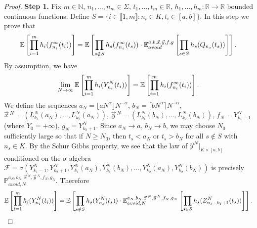 \begin{proof}
	\noindent\textbf{Step 1. } Fix $m\in\mathbb{N}$, $n_1,\dots,n_m\in\Sigma$, $t_1,\dots,t_m\in\mathbb{R}$, $h_1,\dots,h_m : \mathbb{R}\to\mathbb{R}$ bounded continuous functions. Define $S = \{i\in\llbracket 1,m\rrbracket : n_i \in K, t_i \in [a,b]\}$. In this step we prove that
	\begin{equation}\label{BBcondexsplit}
		\mathbb{E}\left[\prod_{i=1}^m h_i(f^\infty_{n_i}(t_i))\right] = \mathbb{E}\left[\prod_{s\notin S} h_s(f^\infty_{n_s}(t_s))\cdot\mathbb{E}^{a,b,\vec{x},\vec{y},f,g}_{avoid}\left[\prod_{s\in S} h_s(Q_{n_s}(t_s))\right]\right].
	\end{equation}
	By assumption, we have
	\begin{equation}\label{BGPweak}
		\lim_{N\to\infty}\mathbb{E}\left[\prod_{i=1}^m h_i(Y^N_{n_i}(t_i))\right] = \mathbb{E}\left[\prod_{i=1}^m h_i(f^\infty_{n_i}(t_i))\right].
	\end{equation}
	We define the sequences $a_N = \lfloor aN^\alpha\rfloor N^{-\alpha}$, $b_N = \lceil bN^\alpha\rceil N^{-\alpha}$, $\vec{x}\,^N = (L_{k_1}^N(a_N),\dots,L_{k_2}^N(a_N))$, $\vec{y}\,^N = (L_{k_1}^N(b_N),\dots,L_{k_2}^N(b_N))$, $f_N = Y_{k_1-1}^N$ (where $Y_0 = +\infty$), $g_N = Y_{k_2+1}^N$. Since $a_N \to a$, $b_N\to b$, we may choose $N_0$ sufficiently large so that if $N\geq N_0$, then $t_s < a_N$ or $t_s > b_N$ for all $s\notin S$ with $n_s \in K$. By the Schur Gibbs property, we see that the law of $\mathcal{Y}^N|_{K\times[a,b]}$ conditioned on the $\sigma$-algebra $\mathcal{F} = \sigma\left(Y^N_{k_1-1}, Y^N_{k_2+1}, Y^N_{k_1}(a_N), Y^N_{k_1}(b_N),\dots,Y^N_{k_2}(a_N),Y^N_{k_2}(b_N)\right)$ is precisely $\mathbb{P}^{a_N,b_N,\vec{x}\,^N,\vec{y}\,^N,f_N,g_N}_{avoid,N}$. Therefore
	\begin{equation}\label{BBschur}
		\mathbb{E}\left[\prod_{i=1}^m h_i(Y^N_{n_i}(t_i))\right] = \mathbb{E}\left[\prod_{s\notin S} h_s(Y^N_{n_s}(t_s))\cdot\mathbb{E}^{a_N,b_N,\vec{x}\,^N,\vec{y}\,^N,f_N,g_N}_{avoid,N}\left[\prod_{s\in S} h_s(Z^N_{n_s-k_1+1}(t_s))\right]\right].
	\end{equation}
	

\end{proof}

